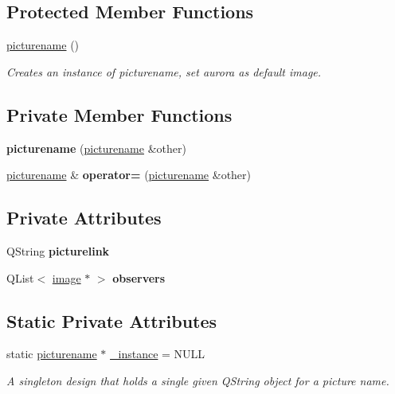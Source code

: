\subsection*{Protected Member Functions}
\begin{DoxyCompactItemize}
\item 
\mbox{\hyperlink{classpicturename_a446962c869c6f39fd01688d94f9cde1b}{picturename}} ()
\begin{DoxyCompactList}\small\item\em Creates an instance of picturename, set aurora as default image. \end{DoxyCompactList}\end{DoxyCompactItemize}
\subsection*{Private Member Functions}
\begin{DoxyCompactItemize}
\item 
\mbox{\label{classpicturename_af440f412d5850406ca92eac1ca7f827d}} 
{\bfseries picturename} (\mbox{\hyperlink{classpicturename}{picturename}} \&other)
\item 
\mbox{\label{classpicturename_ab392e401bcbfd809e1fe221105e92b13}} 
\mbox{\hyperlink{classpicturename}{picturename}} \& {\bfseries operator=} (\mbox{\hyperlink{classpicturename}{picturename}} \&other)
\end{DoxyCompactItemize}
\subsection*{Private Attributes}
\begin{DoxyCompactItemize}
\item 
\mbox{\label{classpicturename_af389638c5b4dbf88569aeb5f2e173ffd}} 
Q\+String {\bfseries picturelink}
\item 
\mbox{\label{classpicturename_a6fe14cb9fa6bde776f9ddf0f1904fbb3}} 
Q\+List$<$ \mbox{\hyperlink{classimage}{image}} $\ast$ $>$ {\bfseries observers}
\end{DoxyCompactItemize}
\subsection*{Static Private Attributes}
\begin{DoxyCompactItemize}
\item 
static \mbox{\hyperlink{classpicturename}{picturename}} $\ast$ \mbox{\hyperlink{classpicturename_ab2f5e20595601416bf9f3e1b65a547d4}{\+\_\+instance}} = N\+U\+LL
\begin{DoxyCompactList}\small\item\em A singleton design that holds a single given Q\+String object for a picture name. \end{DoxyCompactList}\end{DoxyCompactItemize}


